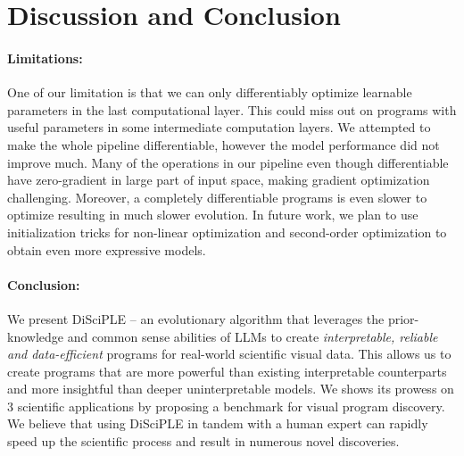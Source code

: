 
\section{Discussion and Conclusion}
\label{sec:conclusion}
\paragraph{Limitations:}One of our limitation is that we can only differentiably optimize learnable parameters in the last computational layer. 
This could miss out on programs with useful parameters in some intermediate computation layers. 
We attempted to make the whole pipeline differentiable, however the model performance did not improve much. 
Many of the operations in our pipeline even though differentiable have zero-gradient in large part of input space, making gradient optimization challenging.
Moreover, a completely differentiable programs is even slower to optimize resulting in much slower evolution.
In future work, we plan to use initialization tricks for non-linear optimization and second-order optimization to obtain even more expressive models.

\paragraph{Conclusion:}We present DiSciPLE -- an evolutionary algorithm that leverages the prior-knowledge and common sense abilities of LLMs to create \emph{interpretable, reliable and data-efficient} programs for real-world scientific visual data. 
This allows us to create programs that are more powerful than existing interpretable counterparts and more insightful than deeper uninterpretable models.
We shows its prowess on 3 scientific applications by proposing a benchmark for visual program discovery.
We believe that using DiSciPLE in tandem with a human expert can rapidly speed up the scientific process and result in numerous novel discoveries.


